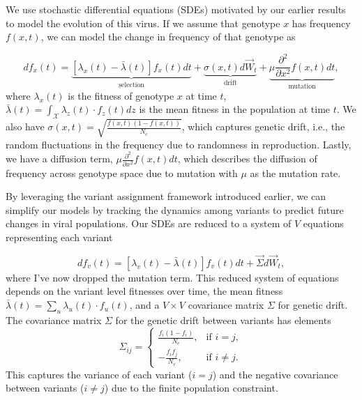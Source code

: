 We use stochastic differential equations (SDEs) motivated by our earlier results to model the evolution of this virus.
If we assume that genotype $x$ has frequency $f(x, t)$, we can model the change in frequency of that genotype as

\begin{equation}
  df_x(t) = \underbrace{\left[\lambda_{x}(t) - \bar{\lambda}(t)\right] f_x(t) dt}_{\text{selection}} + \underbrace{\sigma(x, t) d\vec{W}_{t}}_{\text{drift}} + \underbrace{\mu \frac{\partial^2 }{\partial x^2} f(x,t) dt}_{\text{mutation}},
\end{equation}
where $\lambda_x(t)$ is the fitness of genotype $x$ at time $t$, $\bar{\lambda}(t) = \int_{\mathcal{X}} \lambda_z(t)\cdot f_z(t) dz$ is the mean fitness in the population at time $t$.
We also have $\sigma(x, t) = \sqrt{\frac{f(x,t) (1 - f(x,t))}{N_e}}$, which captures genetic drift, i.e., the random fluctuations in the frequency due to randomness in reproduction.
Lastly, we have a diffusion term, $\mu \frac{\partial^2 }{\partial x^2} f(x,t) dt$, which describes the diffusion of frequency across genotype space due to mutation with $\mu$ as the mutation rate.

By leveraging the variant assignment framework introduced earlier, we can simplify our models by tracking the dynamics among variants to predict future changes in viral populations.
Our SDEs are reduced to a system of $V$ equations representing each variant

\begin{equation}
  df_v(t) = \left[\lambda_{v}(t) - \bar{\lambda}(t)\right] f_v(t) dt + \vec{\Sigma} d\vec{W}_{t},
\end{equation}
where I've now dropped the mutation term.
This reduced system of equations depends on the variant level fitnesses over time, the mean fitness $\bar{\lambda}(t) = \sum_{u} \lambda_u(t)\cdot f_u(t)$, and a $V \times V$ covariance matrix $\Sigma$ for genetic drift.
The covariance matrix $\Sigma$ for the genetic drift between variants has elements
\begin{equation}
\Sigma_{ij} = \begin{cases}
  \frac{f_i (1 - f_i)}{N_e}, & \text{if } i = j, \\
  -\frac{f_i f_j}{N_e}, & \text{if } i \neq j.
\end{cases}
\end{equation}
This captures the variance of each variant ($i = j$) and the negative covariance between variants ($i \neq j$) due to the finite population constraint.

